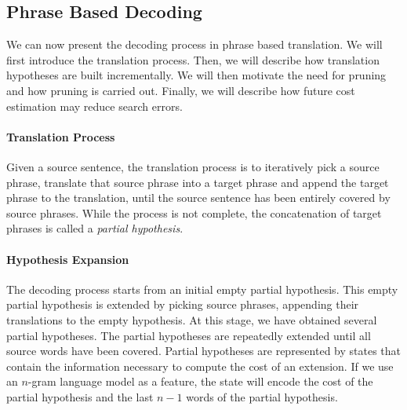 \subsection{Phrase Based Decoding}


We can now present the decoding process in phrase based translation.
We will first introduce the translation process. Then, we will
describe how translation hypotheses are built incrementally.
We will then motivate the need for pruning and how pruning
is carried out. Finally, we will describe how future cost estimation
may reduce search errors.

\paragraph{Translation Process}

Given a source sentence, the translation process is to iteratively
pick a source phrase, translate that source phrase into a target phrase
and append the target phrase to the translation, until the source
sentence has been entirely covered by source phrases. While the process is not
complete, the concatenation of target phrases is called a
\emph{partial hypothesis}.

\paragraph{Hypothesis Expansion}

The decoding process starts from an initial empty partial hypothesis.
This empty partial hypothesis is extended by picking source phrases,
appending their translations to the empty hypothesis.
At this stage, we have obtained several partial hypotheses.
The partial hypotheses are repeatedly extended until
all source words have been covered.
Partial hypotheses are represented by states
that contain the information necessary to
compute the cost of an extension.
If we use an $n$-gram language model as a feature,
the state will encode the cost of the partial hypothesis
and the last $n - 1$ words of the partial hypothesis.


